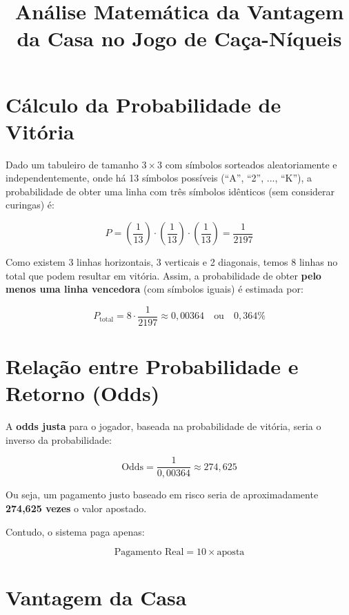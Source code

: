 \documentclass[a4paper,12pt]{article}
\title{Análise Matemática da Vantagem da Casa no Jogo de Caça-Níqueis}
\author{}
\date{}
\begin{document}
\maketitle

\section*{Cálculo da Probabilidade de Vitória}

Dado um tabuleiro de tamanho $3 \times 3$ com símbolos sorteados aleatoriamente e independentemente, onde há 13 símbolos possíveis (``A'', ``2'', ..., ``K''), a probabilidade de obter uma linha com três símbolos idênticos (sem considerar curingas) é:

\begin{equation}
P = \left( \frac{1}{13} \right) \cdot \left( \frac{1}{13} \right) \cdot \left( \frac{1}{13} \right) = \frac{1}{2197}
\end{equation}

Como existem 3 linhas horizontais, 3 verticais e 2 diagonais, temos 8 linhas no total que podem resultar em vitória. Assim, a probabilidade de obter \textbf{pelo menos uma linha vencedora} (com símbolos iguais) é estimada por:

\begin{equation}
P_{\text{total}} = 8 \cdot \frac{1}{2197} \approx 0{,}00364 \quad \text{ou} \quad 0{,}364\%
\end{equation}

\section*{Relação entre Probabilidade e Retorno (Odds)}

A \textbf{odds justa} para o jogador, baseada na probabilidade de vitória, seria o inverso da probabilidade:

\begin{equation}
\text{Odds} = \frac{1}{0{,}00364} \approx 274{,}625
\end{equation}

Ou seja, um pagamento justo baseado em risco seria de aproximadamente \textbf{274,625 vezes} o valor apostado.

Contudo, o sistema paga apenas:

\begin{equation}
\text{Pagamento Real} = 10 \times \text{aposta}
\end{equation}

\section*{Vantagem da Casa}
\end{document}

